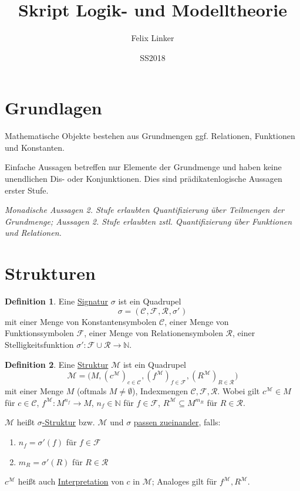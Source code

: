 \documentclass{article}
\title{Skript Logik- und Modelltheorie}
\author{Felix Linker}
\date{SS2018}
\theoremstyle{definition}
\newtheorem{dfn}{Definition}[section]
\theoremstyle{plain}
\newcommand{\m}[1]{\mathcal{#1}}
\newcommand{\sign}[1]{(\m{C}_{#1}, \m{F}_{#1}, \m{R}_{#1}, \sigma'_{#1})}
\newcommand{\struc}[3]{\big(#1, (c^{#2})_{c \in \m{C}_{#3}}, (f^{#2})_{f \in \m{F}_{#3}}, (R^{#2})_{R \in \m{R}_{#3}}\big)}
\begin{document}
    \maketitle

    \section*{Grundlagen}

    Mathematische Objekte bestehen aus Grundmengen ggf. Relationen, Funktionen und Konstanten.

    Einfache Aussagen betreffen nur Elemente der Grundmenge und haben keine unendlichen Dis- oder Konjunktionen.
    Dies sind prädikatenlogische Aussagen erster Stufe.

    \textit{Monadische Aussagen 2. Stufe erlaubten Quantifizierung über Teilmengen der Grundmenge; Aussagen 2. Stufe erlaubten zstl. Quantifizierung über Funktionen und Relationen.}

    \section{Strukturen}

    \begin{dfn}
        Eine \underline{Signatur} $ \sigma $ ist ein Quadrupel
        \begin{equation}
            \sigma = \sign{}
        \end{equation}
        mit einer Menge von Konstantensymbolen $ \m{C} $, einer Menge von Funktionssymbolen $ \m{F} $, einer Menge von Relationensymbolen $ \m{R} $, einer Stelligkeitsfunktion $ \sigma' : \m{F} \cup \m{R} \rightarrow \mathbb{N} $.
    \end{dfn}

    \begin{dfn}
        Eine \underline{Struktur} $ \m{M} $ ist ein Quadrupel
        \begin{equation}
            \m{M} = \struc{M}{\m{M}}{}
        \end{equation}
        mit einer Menge $ M $ (oftmals $ M \neq \emptyset $), Indexmengen $ \m{C}, \m{F}, \m{R} $.
        Wobei gilt $ c^\m{M} \in M $ für $ c \in \m{C} $, $ f^\m{M} : M^{n_f} \rightarrow M $, $ n_f \in \mathbb{N} $ für $ f \in \m{F} $, $ R^\m{M} \subseteq M^{m_R} $ für $ R \in \m{R} $.

        $ \m{M} $ heißt \underline{$ \sigma $-Struktur} bzw. $ \m{M} $ und $ \sigma $ \underline{passen zueinander}, falls:
        \begin{enumerate}
            \item $ n_f = \sigma'(f) $ für $ f \in \m{F} $
            \item $ m_R = \sigma'(R) $ für $ R \in \m{R} $
        \end{enumerate}

        $ c^\m{M} $ heißt auch \underline{Interpretation} von $ c $ in $ \m{M} $; Analoges gilt für $ f^\m{M}, R^\m{M} $.
    \end{dfn}
\end{document}
